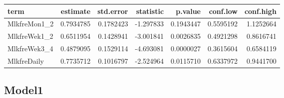 \documentclass[]{article}
\newenvironment{Shaded}{\begin{snugshade}}{\end{snugshade}}
\newcommand{\DataTypeTok}[1]{\textcolor[rgb]{0.13,0.29,0.53}{#1}}
\newcommand{\KeywordTok}[1]{\textcolor[rgb]{0.13,0.29,0.53}{\textbf{#1}}}
\newcommand{\NormalTok}[1]{#1}
\newcommand{\OperatorTok}[1]{\textcolor[rgb]{0.81,0.36,0.00}{\textbf{#1}}}
\newcommand{\OtherTok}[1]{\textcolor[rgb]{0.56,0.35,0.01}{#1}}
\newcommand{\StringTok}[1]{\textcolor[rgb]{0.31,0.60,0.02}{#1}}
\begin{document}
\begin{Shaded}
\end{Shaded}

\begin{longtable}[]{@{}lrrrrrr@{}}
\toprule
term & estimate & std.error & statistic & p.value & conf.low &
conf.high\tabularnewline
\midrule
\endhead
MlkfreMon1\_2 & 0.7934785 & 0.1782423 & -1.297833 & 0.1943447 &
0.5595192 & 1.1252664\tabularnewline
MlkfreWek1\_2 & 0.6511954 & 0.1428941 & -3.001841 & 0.0026835 &
0.4921298 & 0.8616741\tabularnewline
MlkfreWek3\_4 & 0.4879095 & 0.1529114 & -4.693081 & 0.0000027 &
0.3615604 & 0.6584119\tabularnewline
MlkfreDaily & 0.7735712 & 0.1016797 & -2.524964 & 0.0115710 & 0.6337972
& 0.9441700\tabularnewline
\bottomrule
\end{longtable}

\hypertarget{model1-9}{%
\subsection{Model1}\label{model1-9}}

\begin{Shaded}
\end{Shaded}
\end{document}
